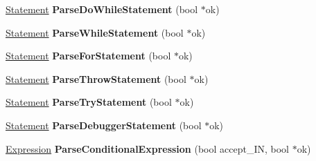 \begin{DoxyCompactItemize}
\item 
\hyperlink{classv8_1_1internal_1_1_pre_parser_statement}{Statement} {\bfseries Parse\+Do\+While\+Statement} (bool $\ast$ok)\hypertarget{classv8_1_1internal_1_1_pre_parser_abdfad2687d56b7d76bc0bb9bbef0798c}{}\label{classv8_1_1internal_1_1_pre_parser_abdfad2687d56b7d76bc0bb9bbef0798c}

\item 
\hyperlink{classv8_1_1internal_1_1_pre_parser_statement}{Statement} {\bfseries Parse\+While\+Statement} (bool $\ast$ok)\hypertarget{classv8_1_1internal_1_1_pre_parser_a5cb59a639f4a991cef3faca63221b4e2}{}\label{classv8_1_1internal_1_1_pre_parser_a5cb59a639f4a991cef3faca63221b4e2}

\item 
\hyperlink{classv8_1_1internal_1_1_pre_parser_statement}{Statement} {\bfseries Parse\+For\+Statement} (bool $\ast$ok)\hypertarget{classv8_1_1internal_1_1_pre_parser_a7e6f07d53ca5e2895400223434f86d3e}{}\label{classv8_1_1internal_1_1_pre_parser_a7e6f07d53ca5e2895400223434f86d3e}

\item 
\hyperlink{classv8_1_1internal_1_1_pre_parser_statement}{Statement} {\bfseries Parse\+Throw\+Statement} (bool $\ast$ok)\hypertarget{classv8_1_1internal_1_1_pre_parser_ad151b8753c6e3384833d04905f33af72}{}\label{classv8_1_1internal_1_1_pre_parser_ad151b8753c6e3384833d04905f33af72}

\item 
\hyperlink{classv8_1_1internal_1_1_pre_parser_statement}{Statement} {\bfseries Parse\+Try\+Statement} (bool $\ast$ok)\hypertarget{classv8_1_1internal_1_1_pre_parser_a117b2e93ee939fd7feff4462632bfc14}{}\label{classv8_1_1internal_1_1_pre_parser_a117b2e93ee939fd7feff4462632bfc14}

\item 
\hyperlink{classv8_1_1internal_1_1_pre_parser_statement}{Statement} {\bfseries Parse\+Debugger\+Statement} (bool $\ast$ok)\hypertarget{classv8_1_1internal_1_1_pre_parser_aee148d24d25ce20926e22aeb4acef9ba}{}\label{classv8_1_1internal_1_1_pre_parser_aee148d24d25ce20926e22aeb4acef9ba}

\item 
\hyperlink{classv8_1_1internal_1_1_pre_parser_expression}{Expression} {\bfseries Parse\+Conditional\+Expression} (bool accept\+\_\+\+IN, bool $\ast$ok)\hypertarget{classv8_1_1internal_1_1_pre_parser_aeabf2bd972b4640cf561d6bc2428a24b}{}\label{classv8_1_1internal_1_1_pre_parser_aeabf2bd972b4640cf561d6bc2428a24b}


\end{DoxyCompactItemize}
